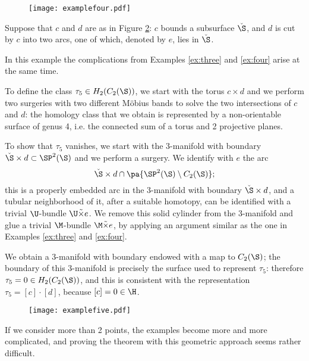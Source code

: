 \begin{figure}[h]\centering
 \texttt{[image: examplefour.pdf]}
 \caption{}
\label{fig:examplefour}
\end{figure}

\begin{ex}
 \label{ex:five}
 Suppose that $c$ and $d$ are as in Figure \ref{fig:examplefive}:
 $c$ bounds a subsurface $\check{\S}$, and $d$ is cut by $c$ into two arcs, one of which, denoted by $e$, lies
 in $\check{\S}$.
 
 In this example the complications from Examples \ref{ex:three} and \ref{ex:four} arise at the same time.
 
 To define the class $\tau_5\in H_2(C_2(\S))$, we start with the torus $c\times d$ and we perform two surgeries
 with two different M\"{o}bius bands to solve the two intersections of $c$ and $d$: the homology
 class that we obtain is represented by a non-orientable surface of genus 4, i.e. the connected
 sum of a torus and 2 projective planes.
 
 To show that $\tau_5$ vanishes, we start with the 3-manifold with boundary $\check{\S}\times d\subset\SP^2(\S)$ and we perform
 a surgery. We identify with $e$ the arc
 \[
  \check{\S}\times d\cap\pa{\SP^2(\S)\setminus C_2(\S)};
 \]
 this is a properly embedded arc in the 3-manifold with boundary $\check{\S}\times d$, and a tubular neighborhood
 of it, after a suitable homotopy, can be identified with a trivial $\U$-bundle $\U\tilde{\times} e$. We remove
 this solid cylinder from the 3-manifold and glue a trivial $\M$-bundle $\M\tilde{\times} e$, by applying an argument
 similar as the one in Examples \ref{ex:three} and \ref{ex:four}.
 
 We obtain a 3-manifold with boundary endowed with a map to $C_2(\S)$; the boundary of this 3-manifold
 is precisely the surface used to represent $\tau_5$: therefore $\tau_5=0\in H_2(C_2(\S))$,
 and this is consistent with the representation $\tau_5=[c]\cdot[d]$, because $[c]=0\in \H$.
\end{ex}

\begin{figure}[h]\centering
 \texttt{[image: examplefive.pdf]}
 \caption{}
\label{fig:examplefive}
\end{figure}

If we consider more than 2 points, the examples become more and more complicated, and proving the theorem with this geometric
approach seems rather difficult.